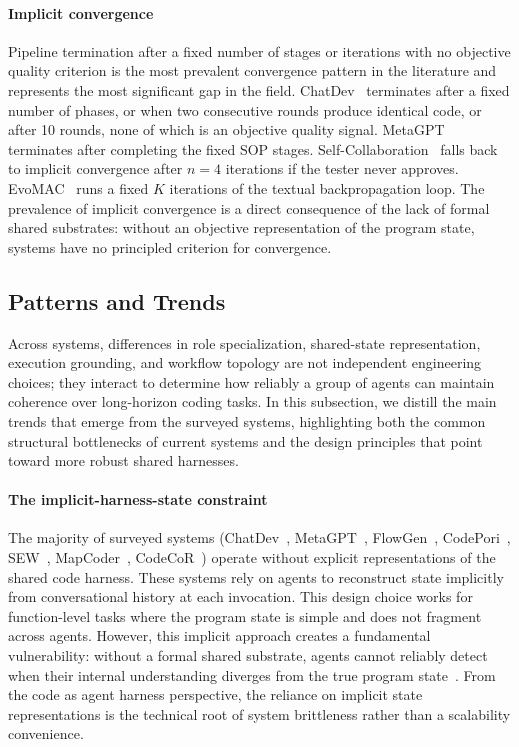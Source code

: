 \documentclass{llmxive}
\begin{document}
\paragraph{Implicit convergence} Pipeline termination after a
fixed number of stages or iterations with no objective quality
criterion is the most prevalent convergence pattern in the
literature and represents the most significant gap in the field.
ChatDev~\cite{Qian2023ChatDev} terminates after a fixed number of
phases, or when two consecutive rounds produce identical code, or
after 10 rounds, none of which is an objective quality signal.
MetaGPT~\cite{Hong2023MetaGPT} terminates after completing the
fixed SOP stages.
Self-Collaboration~\cite{Dong2024SelfCollaboration} falls back to
implicit convergence after $n = 4$ iterations if the tester never
approves. EvoMAC~\cite{Hu2025EvoMAC} runs a fixed $K$ iterations
of the textual backpropagation loop. The prevalence of implicit
convergence is a direct consequence of the lack of formal shared
substrates: without an objective representation of the program
state, systems have no principled criterion for convergence.


\subsection{Patterns and Trends}

Across systems, differences in role specialization, shared-state representation,
execution grounding, and workflow topology are not independent
engineering choices; they interact to determine how reliably a
group of agents can maintain coherence over long-horizon coding
tasks. In this subsection, we distill the main
trends that emerge from the surveyed systems, highlighting both the common
structural bottlenecks of current systems and the design
principles that point toward more robust shared harnesses.


\paragraph{The implicit-harness-state constraint} The majority of
surveyed systems (ChatDev~\cite{Qian2023ChatDev},
MetaGPT~\cite{Hong2023MetaGPT}, FlowGen~\cite{Lin2025Soen101},
CodePori~\cite{Rasheed2024Codepori}, SEW~\cite{Liu2025SEW},
MapCoder~\cite{islam2024mapcoder},
CodeCoR~\cite{Pan2025CodeCoR}) operate without explicit
representations of the shared code harness. These systems rely on
agents to reconstruct state implicitly from conversational
history at each invocation. This design choice works for
function-level tasks where the program state is simple and does
not fragment across agents. However, this implicit approach
creates a fundamental vulnerability: without a formal shared
substrate, agents cannot reliably detect when their internal
understanding diverges from the true program
state~\cite{Guo2025SyncMind}. From the code as agent harness
perspective, the reliance on implicit state representations is
the technical root of system brittleness rather than a
scalability convenience.
\end{document}
